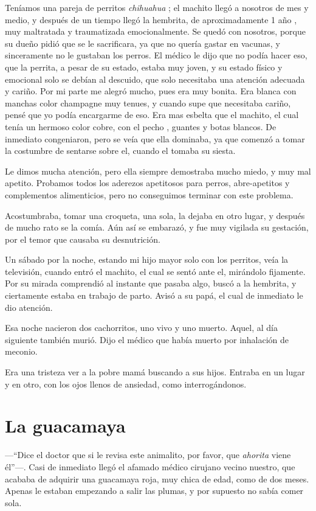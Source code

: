 \documentclass[letterpaper, 12pt]{book}
\begin{document}
Teníamos una pareja de perritos {\it chihuahua} ; el machito llegó a nosotros de mes y medio, y después de un tiempo llegó la hembrita, de aproximadamente 1 año , muy maltratada y traumatizada emocionalmente. Se quedó con nosotros, porque su dueño pidió que se le sacrificara, ya que no quería gastar en vacunas, y sinceramente no le gustaban los perros. El médico le dijo que no podía hacer eso, que la perrita, a pesar de su estado, estaba muy joven, y su estado físico y emocional solo se debían al descuido, que solo necesitaba una atención adecuada y cariño. Por mi parte me alegró mucho, pues era muy bonita. Era blanca con manchas color champagne muy tenues, y cuando supe que necesitaba cariño, pensé que yo podía encargarme de eso. Era mas esbelta que el machito, el cual tenía un hermoso color cobre, con el pecho , guantes y botas blancos. De inmediato congeniaron, pero se veía que ella dominaba, ya que comenzó a tomar la costumbre de sentarse sobre el, cuando el tomaba su siesta. 

Le dimos mucha atención, pero ella siempre demostraba mucho miedo, y muy mal apetito. Probamos todos los aderezos apetitosos para perros, abre-apetitos y complementos alimenticios, pero no conseguimos terminar con este problema. 

Acostumbraba, tomar una croqueta, una sola, la dejaba en otro lugar, y después de mucho rato se la comía. Aún así se embarazó, y fue muy vigilada su gestación, por el temor que causaba su desnutrición.

Un sábado por la noche, estando mi hijo mayor solo con los perritos, veía la televisión, cuando entró el machito, el cual se sentó ante el, mirándolo fijamente. Por su mirada comprendió al instante que pasaba algo, buscó a la hembrita, y ciertamente estaba en trabajo de parto. Avisó a su papá, el cual de inmediato le dio atención. 

Esa noche nacieron dos cachorritos, uno vivo y uno muerto. Aquel, al día siguiente también murió. Dijo el médico que había muerto por inhalación de meconio. 

Era una tristeza ver a la pobre mamá buscando a sus hijos. Entraba en un lugar y en otro, con los ojos llenos de ansiedad, como interrogándonos.

\chapter{La guacamaya}

---``Dice el doctor que si le revisa este animalito, por favor, que {\it ahorita} viene él''---. Casi de inmediato llegó el afamado médico cirujano vecino nuestro, que acababa de adquirir una guacamaya roja, muy chica de edad, como de dos meses. Apenas le estaban empezando a salir las plumas, y por supuesto no sabía comer sola. 
\end{document}
